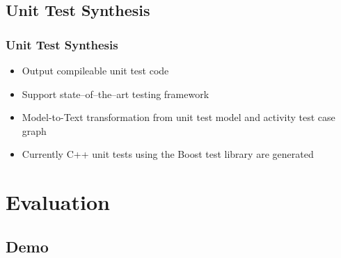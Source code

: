 \documentclass{beamer}
\begin{document}
\subsection{Unit Test Synthesis}
\begin{frame}
\frametitle{Unit Test Synthesis}
\begin{itemize} 
\item Output compileable unit test code
\item Support state--of--the--art testing framework
\end{itemize}
\vspace{0.3cm}
\begin{itemize} 
\item Model-to-Text transformation from unit test model and activity test case graph
\item Currently C++ unit tests using the Boost test library are generated
\end{itemize}
\end{frame}

\section{Evaluation}
\subsection{Demo}
\end{document}

